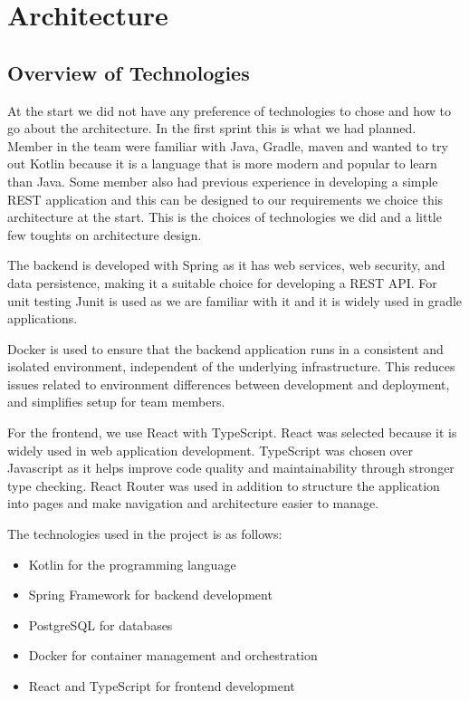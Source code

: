 \section{Architecture}

\subsection*{Overview of Technologies}

At the start we did not have any preference of technologies to chose and how to go about the architecture. In the first sprint this is what we had planned.
Member in the team were familiar with Java, Gradle, maven and wanted to try out Kotlin because it is a language that is more modern and popular to learn than Java.
Some member also had previous experience in developing a simple REST application and this can be designed to our requirements we choice this architecture at the start. This is the choices of technologies we did and a little few toughts on architecture design.

The backend is developed with Spring as it has web services, web security,
and data persistence, making it a suitable choice for developing a REST API.
For unit testing Junit is used as we are familiar with it and it is widely used in gradle applications.

Docker is used to ensure that the backend application runs in a consistent and isolated environment,
independent of the underlying infrastructure.
This reduces issues related to environment differences between development and deployment,
and simplifies setup for team members. 

For the frontend, we use React with TypeScript.
React was selected because it is widely used in web application development.
TypeScript was chosen over Javascript as it helps improve code quality and maintainability through stronger type checking.
React Router was used in addition to structure the application into pages and make navigation and architecture easier to manage.

The technologies used in the project is as follows:
\begin{itemize}
    \item Kotlin for the programming language
    \item Spring Framework for backend development
    \item PostgreSQL for databases
    \item Docker for container management and orchestration
    \item React and TypeScript for frontend development
\end{itemize}

